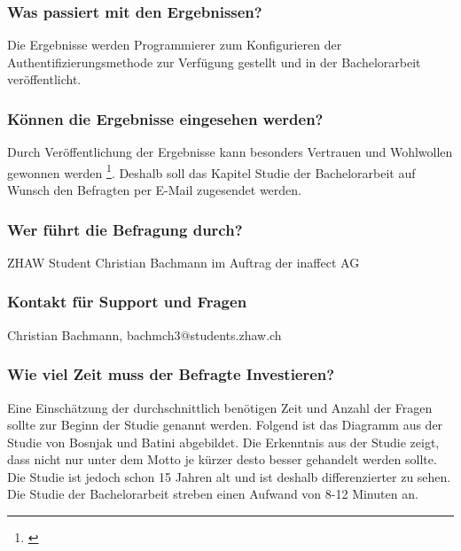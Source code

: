 \subsubsection{Was passiert mit den
Ergebnissen?}\label{was-passiert-mit-den-ergebnissen}

Die Ergebnisse werden Programmierer zum Konfigurieren der
Authentifizierungsmethode zur Verfügung gestellt und in der
Bachelorarbeit veröffentlicht.

\subsubsection{Können die Ergebnisse eingesehen
werden?}\label{kuxf6nnen-die-ergebnisse-eingesehen-werden}

Durch Veröffentlichung der Ergebnisse kann besonders Vertrauen und
Wohlwollen gewonnen werden \footnote{\autocite{fragebogen}}. Deshalb
soll das Kapitel Studie der Bachelorarbeit auf Wunsch den Befragten per
E-Mail zugesendet werden.

\subsubsection{Wer führt die Befragung
durch?}\label{wer-fuxfchrt-die-befragung-durch}

ZHAW Student Christian Bachmann im Auftrag der inaffect AG

\subsubsection{Kontakt für Support und
Fragen}\label{kontakt-fuxfcr-support-und-fragen}

Christian Bachmann, bachmch3@students.zhaw.ch

\subsubsection{Wie viel Zeit muss der Befragte
Investieren?}\label{wie-viel-zeit-muss-der-befragte-investieren}

Eine Einschätzung der durchschnittlich benötigen Zeit und Anzahl der
Fragen sollte zur Beginn der Studie genannt werden. Folgend ist das
Diagramm aus der Studie von Bosnjak und Batini abgebildet. Die
Erkenntnis aus der Studie zeigt, dass nicht nur unter dem Motto je
kürzer desto besser gehandelt werden sollte. Die Studie ist jedoch schon
15 Jahren alt und ist deshalb differenzierter zu sehen. Die Studie der
Bachelorarbeit streben einen Aufwand von 8-12 Minuten an.

